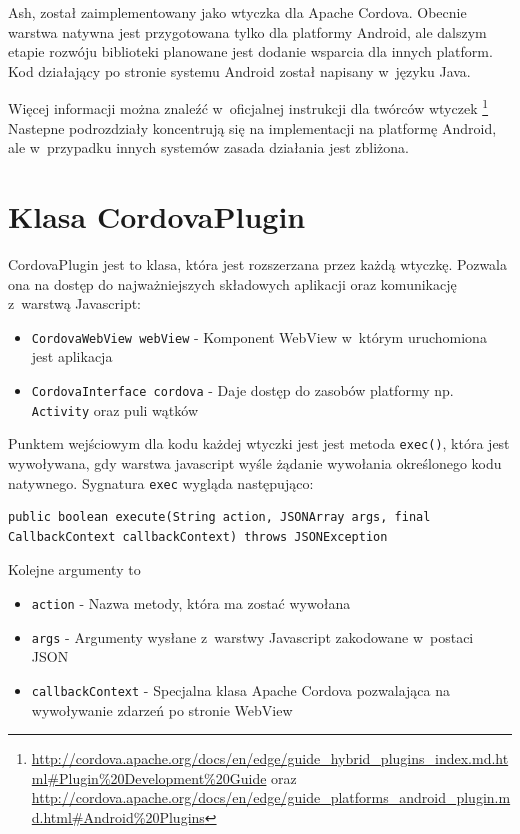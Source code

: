 \documentclass[brudnopis]{xmgr}
\begin{document}
Ash, został zaimplementowany jako wtyczka dla Apache Cordova. Obecnie warstwa natywna jest przygotowana tylko dla platformy Android, ale dalszym etapie rozwóju biblioteki planowane jest dodanie wsparcia dla innych platform. Kod działający po stronie systemu Android został napisany w~języku Java.

Więcej informacji można znaleźć w~oficjalnej instrukcji dla twórców wtyczek
\footnote{
  \url{http://cordova.apache.org/docs/en/edge/guide\_hybrid\_plugins\_index.md.html\#Plugin\%20Development\%20Guide}  
  oraz 
  \url{http://cordova.apache.org/docs/en/edge/guide\_platforms\_android\_plugin.md.html\#Android\%20Plugins}   
}
Nastepne podrozdziały koncentrują się na implementacji na platformę Android, ale w~przypadku innych systemów zasada działania jest zbliżona.

\section{Klasa CordovaPlugin}

CordovaPlugin jest to klasa, która jest rozszerzana przez każdą wtyczkę. Pozwala ona na dostęp do najważniejszych składowych aplikacji oraz komunikację z~warstwą Javascript: 

\begin{itemize}
  \item \texttt{CordovaWebView webView} - Komponent WebView w~którym uruchomiona jest aplikacja
  \item \texttt{CordovaInterface cordova} - Daje dostęp do zasobów platformy np. \texttt{Activity} oraz puli wątków
\end{itemize}

Punktem wejściowym dla kodu każdej wtyczki jest jest metoda \texttt{exec()}, która jest wywoływana, gdy warstwa javascript wyśle żądanie wywołania określonego kodu natywnego. Sygnatura \texttt{exec} wygląda następująco:

\begin{lstlisting}
public boolean execute(String action, JSONArray args, final CallbackContext callbackContext) throws JSONException
\end{lstlisting}

Kolejne argumenty to
\begin{itemize}
  \item \texttt{action} - Nazwa metody, która ma zostać wywołana
  \item \texttt{args} - Argumenty wysłane z~warstwy Javascript zakodowane w~postaci JSON
  \item \texttt{callbackContext} - Specjalna klasa Apache Cordova pozwalająca na wywoływanie zdarzeń po stronie WebView 
\end{itemize}
\end{document}
